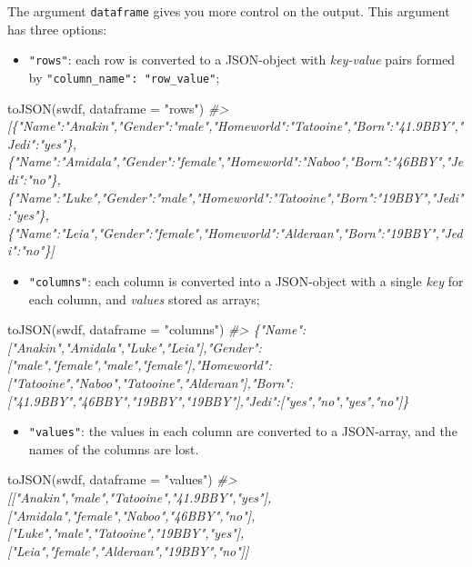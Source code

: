 \documentclass[
]{book}
\newenvironment{Shaded}{\begin{snugshade}}{\end{snugshade}}
\newcommand{\AttributeTok}[1]{\textcolor[rgb]{0.77,0.63,0.00}{#1}}
\newcommand{\CommentTok}[1]{\textcolor[rgb]{0.56,0.35,0.01}{\textit{#1}}}
\newcommand{\FunctionTok}[1]{\textcolor[rgb]{0.00,0.00,0.00}{#1}}
\newcommand{\NormalTok}[1]{#1}
\newcommand{\StringTok}[1]{\textcolor[rgb]{0.31,0.60,0.02}{#1}}
\providecommand{\tightlist}{%
  \setlength{\itemsep}{0pt}\setlength{\parskip}{0pt}}
\begin{document}
The argument \texttt{dataframe} gives you more control on the output. This argument
has three options:

\begin{itemize}
\tightlist
\item
  \texttt{"rows"}: each row is converted to a JSON-object with \emph{key-value} pairs
  formed by \texttt{"column\_name":\ "row\_value"};
\end{itemize}

\begin{Shaded}
\begin{Highlighting}[]
\FunctionTok{toJSON}\NormalTok{(swdf, }\AttributeTok{dataframe =} \StringTok{"rows"}\NormalTok{)}
\CommentTok{\#\textgreater{} [\{"Name":"Anakin","Gender":"male","Homeworld":"Tatooine","Born":"41.9BBY","Jedi":"yes"\},\{"Name":"Amidala","Gender":"female","Homeworld":"Naboo","Born":"46BBY","Jedi":"no"\},\{"Name":"Luke","Gender":"male","Homeworld":"Tatooine","Born":"19BBY","Jedi":"yes"\},\{"Name":"Leia","Gender":"female","Homeworld":"Alderaan","Born":"19BBY","Jedi":"no"\}]}
\end{Highlighting}
\end{Shaded}

\begin{itemize}
\tightlist
\item
  \texttt{"columns"}: each column is converted into a JSON-object with a single \emph{key}
  for each column, and \emph{values} stored as arrays;
\end{itemize}

\begin{Shaded}
\begin{Highlighting}[]
\FunctionTok{toJSON}\NormalTok{(swdf, }\AttributeTok{dataframe =} \StringTok{"columns"}\NormalTok{)}
\CommentTok{\#\textgreater{} \{"Name":["Anakin","Amidala","Luke","Leia"],"Gender":["male","female","male","female"],"Homeworld":["Tatooine","Naboo","Tatooine","Alderaan"],"Born":["41.9BBY","46BBY","19BBY","19BBY"],"Jedi":["yes","no","yes","no"]\}}
\end{Highlighting}
\end{Shaded}

\begin{itemize}
\tightlist
\item
  \texttt{"values"}: the values in each column are converted to a JSON-array, and
  the names of the columns are lost.
\end{itemize}

\begin{Shaded}
\begin{Highlighting}[]
\FunctionTok{toJSON}\NormalTok{(swdf, }\AttributeTok{dataframe =} \StringTok{"values"}\NormalTok{)}
\CommentTok{\#\textgreater{} [["Anakin","male","Tatooine","41.9BBY","yes"],["Amidala","female","Naboo","46BBY","no"],["Luke","male","Tatooine","19BBY","yes"],["Leia","female","Alderaan","19BBY","no"]]}
\end{Highlighting}
\end{Shaded}
\end{document}
